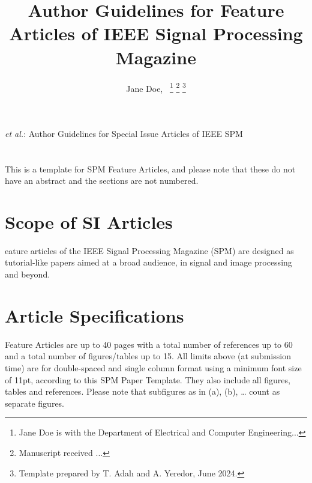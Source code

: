 \documentclass[11pt,draftcls,onecolumn,journal]{IEEEtran}
\begin{document}
\title{Author Guidelines for Feature Articles of IEEE Signal Processing Magazine}

\author{Jane Doe,~
\thanks{Jane Doe is with the Department of Electrical and Computer Engineering...}%
\thanks{Manuscript received ...}
\thanks{Template prepared by T. Adal{\i} and A. Yeredor,  June 2024.}}


%
{\MakeLowercase{\textit{et al.}}: Author Guidelines for Special Issue Articles of IEEE SPM}

\maketitle

\section*{}
\label{sec:abstract}
    This is a template for SPM Feature Articles, and please note that these do not have an abstract and the sections are not numbered. 



\section*{Scope of SI Articles}
\label{sec:scope}
eature articles of the IEEE Signal Processing Magazine (SPM) \cite{ref1} are designed as tutorial-like papers aimed at a broad audience, in signal and image processing and beyond. 
\section*{Article Specifications}
\label{sec:length}
Feature Articles are up to 40 pages with a total number of references up to 60 and a total number of figures/tables up to 15.
\noindent All limits above (at submission time) are for double-spaced and single column format using a minimum font size of 11pt, according to this SPM Paper Template. They also include all figures, tables and references. Please note that subfigures as in (a), (b), … count as separate figures. 
\end{document}
